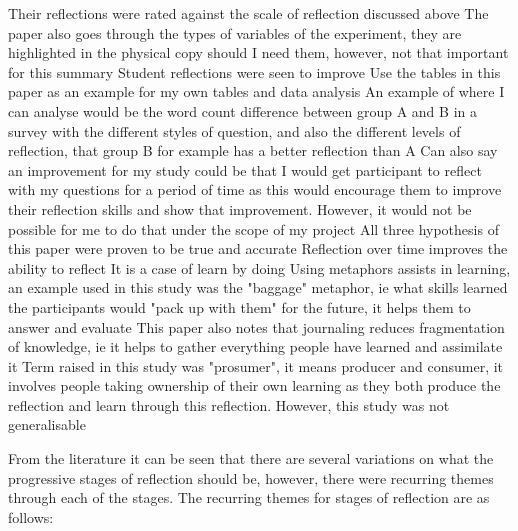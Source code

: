 \documentclass{l4proj}
\begin{document}
Their reflections were rated against the scale of reflection discussed above
The paper also goes through the types of variables of the experiment, they are highlighted in the physical copy should I need them, however, not that important for this summary
Student reflections were seen to improve
Use the tables in this paper as an example for my own tables and data analysis
An example of where I can analyse would be the word count difference between group A and B in a survey with the different styles of question, and also the different levels of reflection, that group B for example has a better reflection than A
Can also say an improvement for my study could be that I would get participant to reflect with my questions for a period of time as this would encourage them to improve their reflection skills and show that improvement. However, it would not be possible for me to do that under the scope of my project
All three hypothesis of this paper were proven to be true and accurate
Reflection over time improves the ability to reflect
It is a case of learn by doing
Using metaphors assists in learning, an example used in this study was the "baggage" metaphor, ie what skills learned the participants would "pack up with them" for the future, it helps them to answer and evaluate
This paper also notes that journaling reduces fragmentation of knowledge, ie it helps to gather everything people have learned and assimilate it
Term raised in this study was "prosumer", it means producer and consumer, it involves people taking ownership of their own learning as they both produce the reflection and learn through this reflection.
However, this study was not generalisable


From the literature it can be seen that there are several variations on what the progressive stages of reflection should be, however, there were recurring 
themes through each of the stages. The recurring themes for stages of reflection are as follows:
\end{document}
